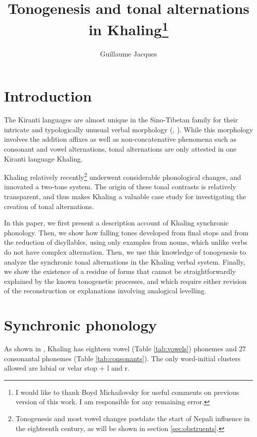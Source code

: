 \documentclass[oldfontcommands,oneside,a4paper,11pt]{article}
\newcommand{\ipa}[1]{{\phon \mbox{#1}}} %
\begin{document}
 

\title{Tonogenesis and tonal alternations in Khaling\footnote{I would like to thank Boyd Michailovsky   for useful comments on previous version of this work. I am responsible for any remaining error.}}
\author{Guillaume Jacques }
\maketitle
\linenumbers

\sloppy
 
 \section{Introduction}
The Kiranti languages are almost unique in the Sino-Tibetan family for their intricate and typologically unusual verbal morphology (\citealt{bickel07chintang}, \citealt{jacques12agreement}). While this morphology involves the addition affixes as well as non-concatenative phenomena such as consonant and vowel alternations, tonal alternations are only attested in one Kiranti language Khaling.

Khaling relatively recently\footnote{Tonogenesis and most vowel changes postdate the start of Nepali influence in the eighteenth century, as will be shown in section \ref{sec:obstruents}.} underwent considerable phonological changes, and innovated a two-tone system. The origin of these tonal contrasts is relatively transparent, and thus makes Khaling a valuable case study for investigating the creation of tonal alternations. 

In this paper, we first present a description account of Khaling synchronic phonology. Then, we show how falling tones developed from final stops and from the reduction of disyllables, using only examples from nouns, which unlike verbs do not have complex alternation. Then, we use this knowledge of tonogenesis to analyze the synchronic tonal alternations in the Khaling verbal system. Finally, we show the existence of a residue of forms that cannot be straightforwardly explained by the known tonogenetic processes, and which require either revision of the reconstruction or explanations involving analogical levelling.

\section{Synchronic phonology} \label{sec:synchr}
As shown in \citet[1098]{jacques12khaling}, Khaling has eighteen vowel (Table \ref{tab:vowels}) phonemes and 27 consonantal phonemes (Table \ref{tab:consonants}). The only word-initial clusters allowed are labial or velar stop + \ipa{l} and \ipa{r}. 
\end{document}
